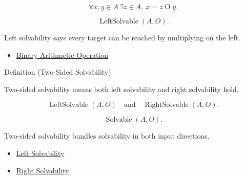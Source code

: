 \begin{remark*}
\[
\forall x,y\in A\,\exists z\in A,\ x=z\mathbin{O}y.
\]
\end{remark*}

\begin{remark*}
\[
\operatorname{LeftSolvable}(A,O).
\]
\end{remark*}

\begin{remark*}[Interpretation]
Left solvability says every target can be reached by multiplying on the left.
\end{remark*}

\begin{dependencies}
\begin{itemize}
  \item \hyperref[def:binary-arithmetic-operation]{Binary Arithmetic Operation}
\end{itemize}
\end{dependencies}

\begin{definitionbox}{Definition (Two-Sided Solvability)}
\begin{definition}
\label{def:two-sided-solvability}
Two-sided solvability means both left solvability and right solvability hold.
\end{definition}
\end{definitionbox}

\begin{remark*}
\[
\operatorname{LeftSolvable}(A,O)
\quad\text{and}\quad
\operatorname{RightSolvable}(A,O).
\]
\end{remark*}

\begin{remark*}
\[
\operatorname{Solvable}(A,O).
\]
\end{remark*}

\begin{remark*}[Interpretation]
Two-sided solvability bundles solvability in both input directions.
\end{remark*}

\begin{dependencies}
\begin{itemize}
  \item \hyperref[def:left-solvability]{Left Solvability}
  \item \hyperref[def:right-solvability]{Right Solvability}
\end{itemize}
\end{dependencies}


